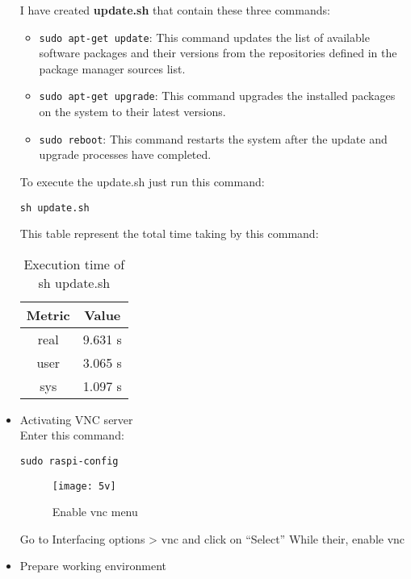 \begin{itemize}
\FloatBarrier
I have created \textbf{update.sh} that contain these three commands:
\begin{itemize}
\item \texttt{sudo apt-get update}: This command updates the list of available software packages and their versions from the repositories defined in the package manager sources list.
\item \texttt{sudo apt-get upgrade}: This command upgrades the installed packages on the system to their latest versions.
\item \texttt{sudo reboot}: This command restarts the system after the update and upgrade processes have completed.
\end{itemize}
To execute the update.sh just run this command:
\begin{lstlisting}
sh update.sh
\end{lstlisting}
This table represent the total time taking by this command:
\begin{table}[h]
    \centering
    \begin{tabular}{|c|c|}
        \hline
        \textbf{Metric} & \textbf{Value} \\
        \hline
        real & 9.631 s \\
        \hline
        user & 3.065 s \\
        \hline
        sys & 1.097 s \\
        \hline
    \end{tabular}
    \caption{Execution time of sh update.sh}
    \label{tab:time}
\end{table}

\item{Activating VNC server}\\
Enter this command:
\begin{lstlisting}
sudo raspi-config
\end{lstlisting}
\FloatBarrier
\begin{figure}[h]

       \centering

        \texttt{[image: 5v]}
   
        \caption{Enable vnc menu}
        \label{fig:Enable vnc menu}

    \end{figure}
\FloatBarrier
Go to Interfacing options > vnc and click on “Select” While their, enable vnc
\item{Prepare working environment}\\
\FloatBarrier
\begin{figure}[h]


\end{figure}
\end{itemize}
